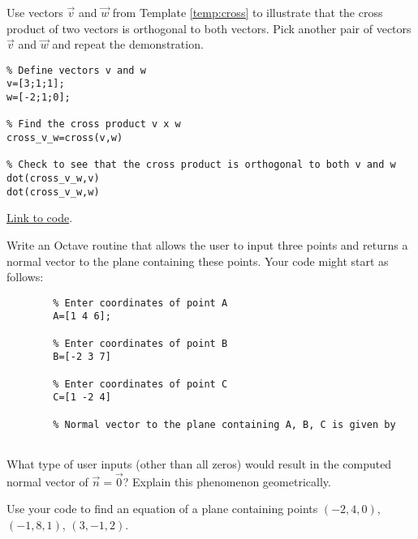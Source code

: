 \documentclass{ximera}
\begin{document}
\begin{problem}\label{prob_oct_vec_1}
    Use vectors $\vec{v}$ and $\vec{w}$ from Template \ref{temp:cross} to illustrate that the cross product of two vectors is orthogonal to both vectors.  Pick another pair of vectors $\vec{v}$ and $\vec{w}$ and repeat the demonstration.
    \begin{hint}
        \begin{verbatim}
% Define vectors v and w
v=[3;1;1];
w=[-2;1;0];

% Find the cross product v x w
cross_v_w=cross(v,w)

% Check to see that the cross product is orthogonal to both v and w
dot(cross_v_w,v)
dot(cross_v_w,w)
\end{verbatim}

\href{https://sagecell.sagemath.org/?z=eJxtjsEKwjAQRO-B_sNeCg1UsHoMOSn-RJES09UEpSvJmvj5phUUxNvMMG9na9jj2U8ICS1TiJDATCPkSiTdb1WnuqOqRNb9alPMejaVqOHgS4kdgg0UI9wDjQ_LBX7O6BIOach6UU1qs3xzO4f2CkwQEQtv-M8RH4ECO7rQZG5z90Tsvn-NxM1noE3yN8nyBT-BRHk=&lang=octave&interacts=eJyLjgUAARUAuQ==}{Link to code}.
    \end{hint}
\end{problem}

\begin{problem}\label{prob_oct_vec_4}
    Write an Octave routine that allows the user to input three points and returns a normal vector to the plane containing these points.  Your code might start as follows:

    \begin{verbatim}
        % Enter coordinates of point A
        A=[1 4 6];
        
        % Enter coordinates of point B
        B=[-2 3 7]
        
        % Enter coordinates of point C
        C=[1 -2 4]
        
        % Normal vector to the plane containing A, B, C is given by
        
    \end{verbatim}

    What type of user inputs (other than all zeros) would result in the computed normal vector of $\vec{n}=\vec{0}$?  Explain this phenomenon geometrically.

    Use your code to find an equation of a plane containing points $(-2, 4, 0)$, $(-1, 8, 1)$, $(3, -1, 2)$.
\end{problem}    
\end{document}
